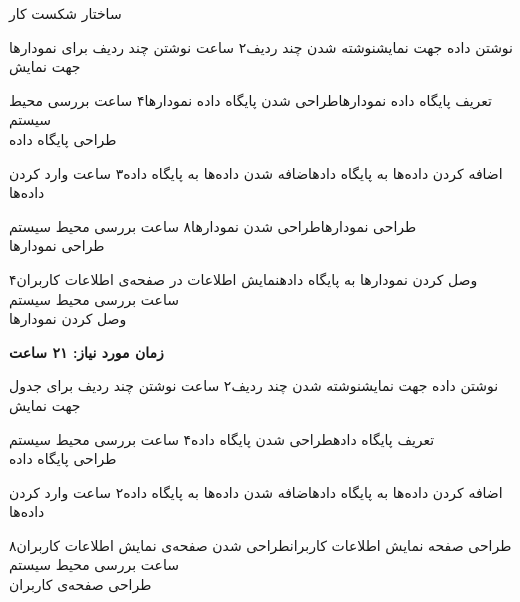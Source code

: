 \begin{wbsbox}{ساختار شکست کار}
\begin{wbssub}{نوشتن داده جهت نمایش}{نوشته شدن چند ردیف}{۲ ساعت}
\task نوشتن چند ردیف برای نمودارها جهت نمایش
\end{wbssub}

\begin{wbssub}{تعریف پایگاه داده نمودارها}{طراحی شدن پایگاه داده نمودارها}{۴ ساعت}
\task بررسی محیط سیستم  \\
\task طراحی پایگاه داده
\end{wbssub}

\begin{wbssub}{اضافه کردن داده‌ها به پایگاه داده}{اضافه شدن داده‌ها به پایگاه داده}{۳ ساعت}
\task وارد کردن داده‌ها
\end{wbssub}

\begin{wbssub}{طراحی نمودارها}{طراحی شدن نمودارها}{۸ ساعت}
\task بررسی محیط سیستم  \\
\task طراحی نمودار‌ها
\end{wbssub}

\begin{wbssub}{وصل کردن نمودارها به پایگاه داده}{نمایش اطلاعات در صفحه‌ی اطلاعات کاربران}{۴ ساعت}
\task بررسی محیط سیستم  \\
\task وصل کردن نمودارها
\end{wbssub}
\begin{center}
\textbf{زمان مورد نیاز: ۲۱ ساعت}
\end{center}

\begin{wbssub}{نوشتن داده جهت نمایش}{نوشته شدن چند ردیف}{۲ ساعت}
\task نوشتن چند ردیف برای جدول جهت نمایش
\end{wbssub}

\begin{wbssub}{تعریف پایگاه داده}{طراحی شدن پایگاه داده}{۴ ساعت}
\task بررسی محیط سیستم  \\
\task طراحی پایگاه داده
\end{wbssub}

\begin{wbssub}{اضافه کردن داده‌ها به پایگاه داده}{اضافه شدن داده‌ها به پایگاه داده}{۲ ساعت}
\task وارد کردن داده‌ها
\end{wbssub}

\begin{wbssub}{طراحی صفحه نمایش اطلاعات کاربران}{طراحی شدن صفحه‌ی نمایش اطلاعات کاربران}{۸ ساعت}
\task بررسی محیط سیستم  \\
\task طراحی صفحه‌ی کاربران
\end{wbssub}


\end{wbsbox}
